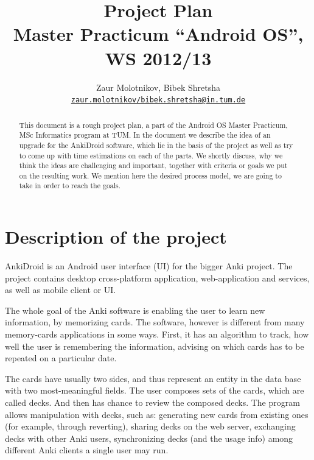 \documentclass[a4paper,11pt,twoside]{article}
\begin{document}

\title{Project Plan\\
{\normalsize Master Practicum ``Android OS'', WS 2012/13}}


\author{%
  Zaur Molotnikov, Bibek Shretsha\\%
  \texttt{\url{zaur.molotnikov/bibek.shretsha@in.tum.de}}%
}



\maketitle



\pagebreak


\begin{abstract}
This document is a rough project plan, a part of the Android OS Master Practicum, MSc Informatics program at TUM.
In the document we describe the idea of an upgrade for the AnkiDroid software, 
which lie in the basis of the project as well as try to come up with time estimations on each of the parts.
We shortly discuss, why we think the ideas are challenging and important, together with criteria or goals we put on the 
resulting work. We mention here the desired process model, we are going to take in order to reach the goals.
\end{abstract}

\pagebreak

\tableofcontents

\pagebreak

\section{Description of the project}
\label{sec:intro}
AnkiDroid is an Android user interface (UI) for the bigger Anki project. The project contains desktop cross-platform 
application, web-application and services, as well as mobile client or UI. 

The whole goal of the Anki software is enabling the user to learn new information, by memorizing cards. The software,
however is different from many memory-cards applications in some ways. First, it has an algorithm to track, how well
the user is remembering the information, advising on which cards has to be repeated on a particular date.


The cards have usually two sides, and thus represent an entity in the data base with two most-meaningful fields. The
user composes sets of the cards, which are called decks. And then has chance to review the composed decks. The program
allows manipulation with decks, such as: generating new cards from existing ones (for example, through reverting),
sharing decks on the web server, exchanging decks with other Anki users, synchronizing decks (and the usage info) among 
different Anki clients a single user may run.
\end{document}
